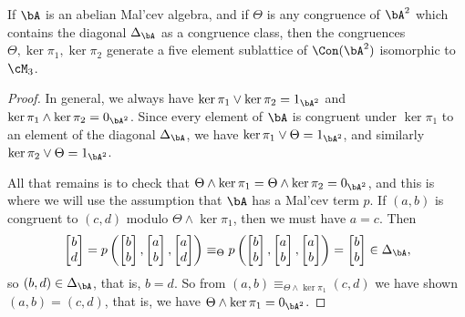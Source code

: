 \begin{thm}\label{abelian-M3} If $\bA$ is an abelian Mal'cev algebra, and if $\Theta$ is any congruence of $\bA^2$ which contains the diagonal $\Delta_\bA$ as a congruence class, then the congruences $\Theta, \ker \pi_1, \ker \pi_2$ generate a five element sublattice of $\Con(\bA^2)$ isomorphic to $\cM_3$.
\end{thm}
\begin{proof} In general, we always have $\ker \pi_1 \vee \ker \pi_2 = 1_{\bA^2}$ and $\ker \pi_1 \wedge \ker \pi_2 = 0_{\bA^2}$. Since every element of $\bA$ is congruent under $\ker \pi_1$ to an element of the diagonal $\Delta_\bA$, we have $\ker \pi_1 \vee \Theta = 1_{\bA^2}$, and similarly $\ker \pi_2 \vee \Theta = 1_{\bA^2}$.

All that remains is to check that $\Theta \wedge \ker \pi_1 = \Theta\wedge \ker \pi_2 = 0_{\bA^2}$, and this is where we will use the assumption that $\bA$ has a Mal'cev term $p$. If $(a,b)$ is congruent to $(c,d)$ modulo $\Theta \wedge \ker \pi_1$, then we must have $a = c$. Then 
\[
\begin{bmatrix} b\\ d\end{bmatrix} = p\left(\begin{bmatrix} b\\ b\end{bmatrix}, \begin{bmatrix} a\\ b\end{bmatrix}, \begin{bmatrix} a\\ d\end{bmatrix}\right) \equiv_\Theta p\left(\begin{bmatrix} b\\ b\end{bmatrix}, \begin{bmatrix} a\\ b\end{bmatrix}, \begin{bmatrix} a\\ b\end{bmatrix}\right) = \begin{bmatrix} b\\ b\end{bmatrix} \in \Delta_\bA,
\]
so $(b,d) \in \Delta_\bA$, that is, $b = d$. So from $(a,b) \equiv_{\Theta \wedge \ker \pi_1} (c,d)$ we have shown $(a,b) = (c,d)$, that is, we have $\Theta \wedge \ker \pi_1 = 0_{\bA^2}$.
\end{proof}

